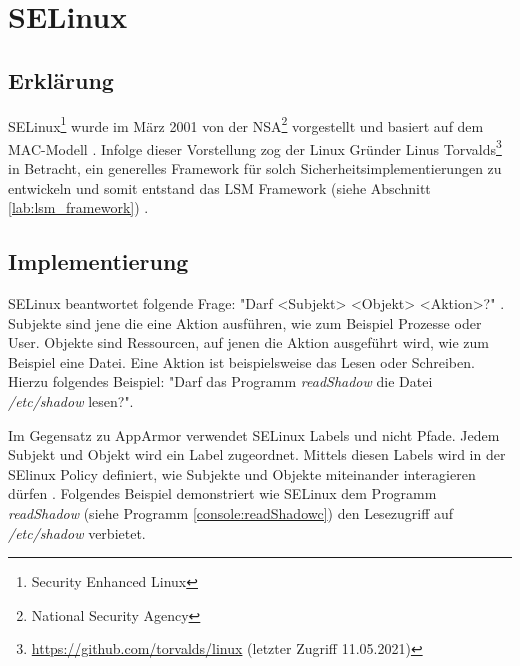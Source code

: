 \section{SELinux}
\label{lab:selinux}
\subsection{Erklärung}
SELinux\footnote{Security Enhanced Linux} wurde im März 2001 von der
NSA\footnote{National Security Agency} vorgestellt und basiert auf dem
MAC-Modell \cite[6]{selinuxmodule}. Infolge dieser Vorstellung zog der Linux
Gründer Linus Torvalds\footnote{\url{https://github.com/torvalds/linux}
(letzter Zugriff 11.05.2021)} in Betracht, ein generelles Framework für solch
Sicherheitsimplementierungen zu entwickeln und somit entstand das LSM Framework
(siehe Abschnitt \ref{lab:lsm_framework})
\cite{kernel_lsm_linus_lsm_idee}.

\subsection{Implementierung}
SELinux beantwortet folgende Frage: "Darf <Subjekt> <Objekt> <Aktion>?"
\cite[7]{selinuxredhat}. Subjekte sind jene die eine Aktion ausführen, wie zum
Beispiel Prozesse oder User. Objekte sind Ressourcen, auf jenen die Aktion
ausgeführt wird, wie zum Beispiel eine Datei. Eine Aktion ist beispielsweise
das Lesen oder Schreiben. Hierzu folgendes Beispiel: "Darf das Programm
\emph{readShadow} die Datei \emph{/etc/shadow} lesen?".

Im Gegensatz zu AppArmor verwendet SELinux Labels und nicht Pfade. Jedem
Subjekt und Objekt wird ein Label zugeordnet. Mittels diesen Labels wird in der
SElinux Policy definiert, wie Subjekte und Objekte miteinander interagieren
dürfen \cite{selinuxredhat}. Folgendes Beispiel demonstriert wie SELinux dem
Programm \emph{readShadow} (siehe Programm \ref{console:readShadowc}) den
Lesezugriff auf \emph{/etc/shadow} verbietet. 

\clearpage

